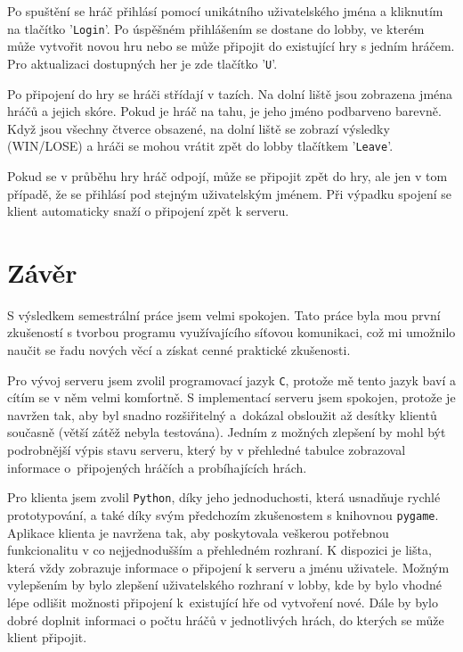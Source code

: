 \documentclass[11pt,a4paper]{article}
\begin{document}
Po spuštění se hráč přihlásí pomocí unikátního uživatelského jména a kliknutím na tlačítko '\texttt{Login}'. Po úspěšném přihlášením se dostane do lobby, ve kterém může vytvořit novou hru nebo se může připojit do existující hry s jedním hráčem. Pro aktualizaci dostupných her je zde tlačítko '\texttt{U}'.

Po připojení do hry se hráči střídají v tazích. Na dolní liště jsou zobrazena jména hráčů a jejich skóre. Pokud je hráč na tahu, je jeho jméno podbarveno barevně. Když jsou všechny čtverce obsazené, na dolní liště se zobrazí výsledky (WIN/LOSE) a hráči se mohou vrátit zpět do lobby tlačítkem '\texttt{Leave}'.

Pokud se v průběhu hry hráč odpojí, může se připojit zpět do hry, ale jen v tom případě, že se přihlásí pod stejným uživatelským jménem. Při výpadku spojení se klient automaticky snaží o připojení zpět k serveru.

\section{Závěr}
S výsledkem semestrální práce jsem velmi spokojen. Tato práce byla mou první zkušeností s tvorbou programu využívajícího síťovou komunikaci, což mi umožnilo naučit se řadu nových věcí a získat cenné praktické zkušenosti.

Pro vývoj serveru jsem zvolil programovací jazyk \texttt{C}, protože mě tento jazyk baví a cítím se v něm velmi komfortně. S implementací serveru jsem spokojen, protože je navržen tak, aby byl snadno rozšiřitelný a~dokázal obsloužit až desítky klientů současně (větší zátěž nebyla testována). Jedním z možných zlepšení by mohl být podrobnější výpis stavu serveru, který by v přehledné tabulce zobrazoval informace o~připojených hráčích a probíhajících hrách.

Pro klienta jsem zvolil \texttt{Python}, díky jeho jednoduchosti, která usnadňuje rychlé prototypování, a také díky svým předchozím zkušenostem s knihovnou \texttt{pygame}. Aplikace klienta je navržena tak, aby poskytovala veškerou potřebnou funkcionalitu v co nejjednodušším a přehledném rozhraní. K dispozici je lišta, která vždy zobrazuje informace o připojení k serveru a jménu uživatele. Možným vylepšením by bylo zlepšení uživatelského rozhraní v lobby, kde by bylo vhodné lépe odlišit možnosti připojení k~existující hře od vytvoření nové. Dále by bylo dobré doplnit informaci o počtu hráčů v jednotlivých hrách, do kterých se může klient připojit.
\end{document}
